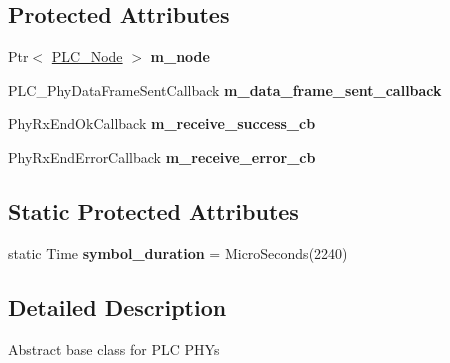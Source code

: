 \subsection*{\-Protected \-Attributes}
\begin{DoxyCompactItemize}
\item 
\hypertarget{classns3_1_1PLC__Phy_a1bc49688d4ac54538439e1a39a595be0}{\-Ptr$<$ \hyperlink{classns3_1_1PLC__Node}{\-P\-L\-C\-\_\-\-Node} $>$ {\bfseries m\-\_\-node}}\label{classns3_1_1PLC__Phy_a1bc49688d4ac54538439e1a39a595be0}

\item 
\hypertarget{classns3_1_1PLC__Phy_afc2005e3f6427922206d8a7255b985df}{\-P\-L\-C\-\_\-\-Phy\-Data\-Frame\-Sent\-Callback {\bfseries m\-\_\-data\-\_\-frame\-\_\-sent\-\_\-callback}}\label{classns3_1_1PLC__Phy_afc2005e3f6427922206d8a7255b985df}

\item 
\hypertarget{classns3_1_1PLC__Phy_a3cb312c1f9c2adb0f5565a3c7fa619a3}{\-Phy\-Rx\-End\-Ok\-Callback {\bfseries m\-\_\-receive\-\_\-success\-\_\-cb}}\label{classns3_1_1PLC__Phy_a3cb312c1f9c2adb0f5565a3c7fa619a3}

\item 
\hypertarget{classns3_1_1PLC__Phy_a199024edfc1cb1242e1b66ec56239d44}{\-Phy\-Rx\-End\-Error\-Callback {\bfseries m\-\_\-receive\-\_\-error\-\_\-cb}}\label{classns3_1_1PLC__Phy_a199024edfc1cb1242e1b66ec56239d44}

\end{DoxyCompactItemize}
\subsection*{\-Static \-Protected \-Attributes}
\begin{DoxyCompactItemize}
\item 
\hypertarget{classns3_1_1PLC__Phy_ac75ba543faa54de93f57144070b4e420}{static \-Time {\bfseries symbol\-\_\-duration} = \-Micro\-Seconds(2240)}\label{classns3_1_1PLC__Phy_ac75ba543faa54de93f57144070b4e420}

\end{DoxyCompactItemize}


\subsection{\-Detailed \-Description}
\-Abstract base class for \-P\-L\-C \-P\-H\-Ys 

